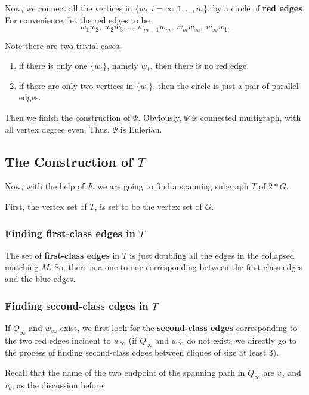 \documentclass[12pt]{article}
\begin{document}
Now, we connect all the vertices in $\{w_i;i=\infty,1,\ldots,m\}$, by a circle of {\bf red edges}. For convenience, let the red edges to be $$w_1w_2,~w_2w_3,\ldots,w_{m-1}w_m,~w_mw_{\infty},~w_{\infty}w_1.$$

 Note there are two trivial cases:
\begin{enumerate}
\item if there is only one $\{w_i\}$, namely $w_1$, then there is no red edge.
\item if there are only two vertices in $\{w_i\}$, then the circle is just a pair of parallel edges.
\end{enumerate}

Then we finish the construction of $\Psi$. Obviously, $\Psi$ is connected multigraph, with all vertex degree even. Thus, $\Psi$ is Eulerian.







\subsection{The Construction of $T$}


Now, with the help of $\Psi$, we are going to find a spanning subgraph $T$ of $2*G$.

First, the vertex set of $T$, is set to be the vertex set of $G$.

\subsubsection{
Finding first-class edges in $T$}
The set of {\bf first-class edges} in $T$ is just doubling all the edges in the collapsed matching $M$. So, there is a one to one corresponding between the first-class edges and the blue edges.



\subsubsection{
Finding second-class edges in $T$}
If $Q_{\infty}$ and $w_{\infty}$ exist, we first look for the {\bf second-class edges} corresponding to the two red edges incident to $w_{\infty}$ (if $Q_{\infty}$ and $w_{\infty}$ do not exist, we directly go to the process of finding second-class edges between cliques of size at least 3).


Recall that the name of the two endpoint of the spanning path in $Q_{\infty}$ are $v_a$ and $v_b$, as the discussion before.
\end{document}
